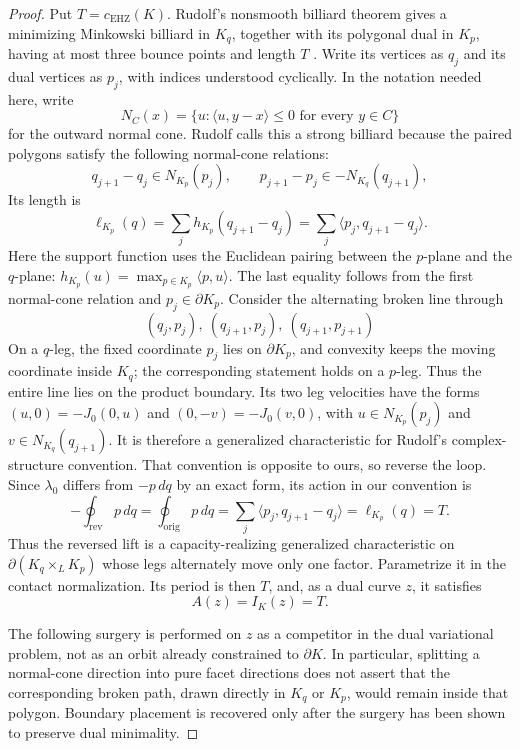 \begin{proof}
Put \(T=c_{\mathrm{EHZ}}(K)\). Rudolf's nonsmooth billiard theorem gives a
minimizing Minkowski billiard in \(K_q\), together with its polygonal
dual in \(K_p\), having at most three bounce points and length \(T\)
\cite[Theorem~1]{Rudolf2022}. Write its vertices as \(q_j\) and its dual
vertices as \(p_j\), with indices understood cyclically.  In the notation
needed here, write
\[
  N_C(x)=\{u:\langle u,y-x\rangle\leq0\text{ for every }y\in C\}
\]
for the outward normal cone. Rudolf calls this a strong billiard because
the paired polygons satisfy the following normal-cone relations:
\[
  q_{j+1}-q_j\in N_{K_p}(p_j),
  \qquad
  p_{j+1}-p_j\in-N_{K_q}(q_{j+1}),
\]
Its length is
\[
  \ell_{K_p}(q)
  =\sum_j h_{K_p}(q_{j+1}-q_j)
  =\sum_j\langle p_j,q_{j+1}-q_j\rangle.
\]
Here the support function uses the Euclidean pairing between the \(p\)-plane
and the \(q\)-plane: \(h_{K_p}(u)=\max_{p\in K_p}\langle p,u\rangle\).
The last equality follows from the first normal-cone relation and
\(p_j\in\partial K_p\). Consider the alternating broken line through
\[
  (q_j,p_j),\ (q_{j+1},p_j),\ (q_{j+1},p_{j+1})
\]
On a \(q\)-leg, the fixed coordinate \(p_j\) lies on \(\partial K_p\),
and convexity keeps the moving coordinate inside \(K_q\); the corresponding
statement holds on a \(p\)-leg. Thus the entire line lies on the product
boundary. Its two leg velocities have the forms
\((u,0)=-J_0(0,u)\) and \((0,-v)=-J_0(v,0)\), with
\(u\in N_{K_p}(p_j)\) and \(v\in N_{K_q}(q_{j+1})\).
It is therefore a generalized characteristic for Rudolf's complex-structure convention.
That convention is opposite to ours, so reverse the loop. Since \(\lambda_0\)
differs from \(-p\,dq\) by an exact form, its action in our convention is
\[
  -\oint_{\mathrm{rev}}p\,dq
  =\oint_{\mathrm{orig}}p\,dq
  =\sum_j\langle p_j,q_{j+1}-q_j\rangle
  =\ell_{K_p}(q)=T.
\]
Thus the reversed lift is a capacity-realizing generalized characteristic on
\(\partial(K_q\times_L K_p)\) whose legs alternately move only one factor.
Parametrize it in the contact normalization. Its period is then \(T\), and, as
a dual curve \(z\), it satisfies
\[
  A(z)=I_K(z)=T.
\]

The following surgery is performed on \(z\) as a competitor in the dual
variational problem, not as an orbit already constrained to \(\partial K\).
In particular, splitting a normal-cone direction into pure facet directions
does not assert that the corresponding broken path, drawn directly in
\(K_q\) or \(K_p\), would remain inside that polygon.  Boundary placement is
recovered only after the surgery has been shown to preserve dual minimality.


\end{proof}
